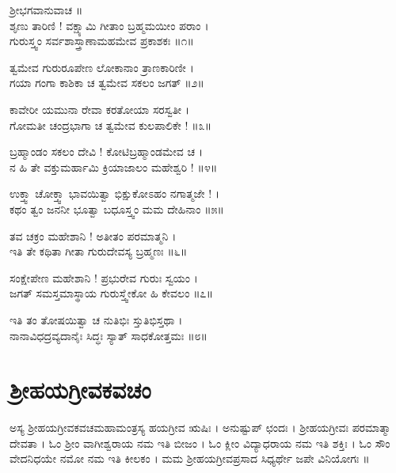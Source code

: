 ಶ್ರೀಭಗವಾನುವಾಚ ॥\\
ಶೃಣು ತಾರಿಣಿ ! ವಕ್ಷ್ಯಾಮಿ ಗೀತಾಂ ಬ್ರಹ್ಮಮಯೀಂ ಪರಾಂ ।\\
ಗುರುಸ್ತ್ವಂ ಸರ್ವಶಾಸ್ತ್ರಾಣಾಮಹಮೇವ ಪ್ರಕಾಶಕಃ ॥೧॥

ತ್ವಮೇವ ಗುರುರೂಪೇಣ ಲೋಕಾನಾಂ ತ್ರಾಣಕಾರಿಣೀ ।\\
ಗಯಾ ಗಂಗಾ ಕಾಶಿಕಾ ಚ ತ್ವಮೇವ ಸಕಲಂ ಜಗತ್ ॥೨॥

ಕಾವೇರೀ ಯಮುನಾ ರೇವಾ ಕರತೋಯಾ ಸರಸ್ವತೀ ।\\
ಗೋಮತೀ ಚಂದ್ರಭಾಗಾ ಚ ತ್ವಮೇವ ಕುಲಪಾಲಿಕೇ ! ॥೩॥

ಬ್ರಹ್ಮಾಂಡಂ ಸಕಲಂ ದೇವಿ ! ಕೋಟಿಬ್ರಹ್ಮಾಂಡಮೇವ ಚ ।\\
ನ ಹಿ ತೇ ವಕ್ತುಮರ್ಹಾಮಿ ಕ್ರಿಯಾಜಾಲಂ ಮಹೇಶ್ವರಿ ! ॥೪॥

ಉಕ್ತ್ವಾ ಚೋಕ್ತ್ವಾ ಭಾವಯಿತ್ವಾ ಭಿಕ್ಷುಕೋಽಹಂ ನಗಾತ್ಮಜೇ ! ।\\
ಕಥಂ ತ್ವಂ ಜನನೀ ಭೂತ್ವಾ ಬಧೂಸ್ತ್ವಂ ಮಮ ದೇಹಿನಾಂ ॥೫॥

ತವ ಚಕ್ರಂ ಮಹೇಶಾನಿ ! ಅತೀತಂ ಪರಮಾತ್ಮನಿ ।\\
ಇತಿ ತೇ ಕಥಿತಾ ಗೀತಾ ಗುರುದೇವಸ್ಯ ಬ್ರಹ್ಮಣಃ ॥೬॥

ಸಂಕ್ಷೇಪೇಣ ಮಹೇಶಾನಿ ! ಪ್ರಭುರೇವ ಗುರುಃ ಸ್ವಯಂ ।\\
ಜಗತ್ ಸಮಸ್ತಮಾಸ್ಥಾಯ ಗುರುಸ್ತ್ವೇಕೋ ಹಿ ಕೇವಲಂ ॥೭॥

ಇತಿ ತಂ ತೋಷಯಿತ್ವಾ ಚ ನುತಿಭಿಃ ಸ್ತುತಿಭಿಸ್ತಥಾ ।\\
ನಾನಾವಿಧದ್ರವ್ಯದಾನೈಃ ಸಿದ್ಧಃ ಸ್ಯಾತ್ ಸಾಧಕೋತ್ತಮಃ ॥೮॥


\section{ಶ್ರೀಹಯಗ್ರೀವಕವಚಂ}


ಅಸ್ಯ ಶ್ರೀಹಯಗ್ರೀವಕವಚಮಹಾಮಂತ್ರಸ್ಯ ಹಯಗ್ರೀವ ಋಷಿಃ । ಅನುಷ್ಟುಪ್ ಛಂದಃ । ಶ್ರೀಹಯಗ್ರೀವಃ ಪರಮಾತ್ಮಾ ದೇವತಾ । ಓಂ ಶ್ರೀಂ ವಾಗೀಶ್ವರಾಯ ನಮ ಇತಿ ಬೀಜಂ । ಓಂ ಕ್ಲೀಂ ವಿದ್ಯಾಧರಾಯ ನಮ ಇತಿ ಶಕ್ತಿಃ । ಓಂ ಸೌಂ ವೇದನಿಧಯೇ ನಮೋ ನಮ ಇತಿ ಕೀಲಕಂ । ಮಮ ಶ್ರೀಹಯಗ್ರೀವಪ್ರಸಾದ ಸಿಧ್ಯರ್ಥೇ ಜಪೇ ವಿನಿಯೋಗಃ ॥


